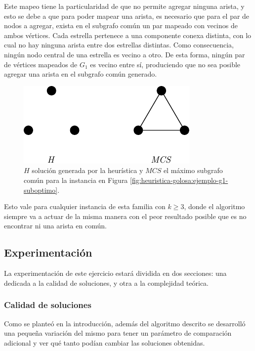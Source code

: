 Este mapeo tiene la particularidad de que no permite agregar ninguna arista, y
esto se debe a que para poder mapear una arista, es necesario que para el par de
nodos a agregar, exista en el subgrafo común un par mapeado con vecinos de ambos
vértices. Cada estrella pertenece a una componente conexa distinta, con lo cual
no hay ninguna arista entre dos estrellas distintas. Como consecuencia, ningún
nodo central de una estrella es vecino a otro. De esta forma, ningún par de
vértices mapeados de $G_1$ es vecino entre sí, produciendo que no sea posible
agregar una arista en el subgrafo común generado.

\begin{figure}[H]
	\centering
	\includegraphics{imagenes/ex4_solution.pdf}
	\caption{$H$ solución generada por la heurística y $MCS$ el máximo subgrafo
	común para la instancia en Figura \ref{fig:heuristica-golosa:ejemplo-g1-suboptimo}.}
	\label{fig:heuristica-golosa:ejemplo-g1-suboptimo-solucion}
\end{figure}

Esto vale para cualquier instancia de esta familia con $k \geq 3$, donde el
algoritmo siempre va a actuar de la misma manera con el peor resultado posible
que es no encontrar ni una arista en común.

\subsection{Experimentación}

La experimentación de este ejercicio estará dividida en dos secciones: una
dedicada a la calidad de soluciones, y otra a la complejidad teórica.

\subsubsection{Calidad de soluciones}

Como se planteó en la introducción, además del algoritmo descrito se desarrolló
una pequeña variación del mismo para tener un parámetro de comparación adicional
y ver qué tanto podían cambiar las soluciones obtenidas.

